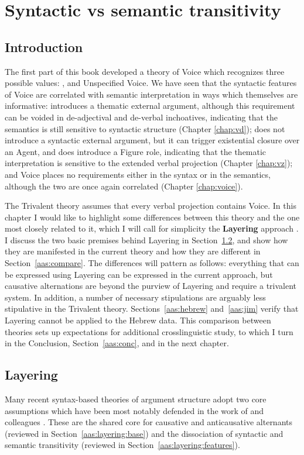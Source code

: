 \chapter{Syntactic vs semantic transitivity}
\label{chap:aas}

\section{Introduction} \label{sec:intro}
The first part of this book developed a theory of Voice which recognizes three possible values: {\vd}, {\vz} and Unspecified Voice. We have seen that the syntactic features of Voice are correlated with semantic interpretation in ways which themselves are informative: {\vd} introduces a thematic external argument, although this requirement can be voided in de-adjectival and de-verbal inchoatives, indicating that the semantics is still sensitive to syntactic structure (Chapter \ref{chap:vd}); {\vz} does not introduce a syntactic external argument, but it can trigger existential closure over an Agent, and {\pz} does introduce a Figure role, indicating that the thematic interpretation is sensitive to the extended verbal projection (Chapter \ref{chap:vz}); and Voice places no requirements either in the syntax or in the semantics, although the two are once again correlated (Chapter \ref{chap:voice}).

The Trivalent theory assumes that every verbal projection contains Voice. In this chapter I would like to highlight some differences between this theory and the one most closely related to it, which I will call for simplicity the \textbf{Layering} approach \citep{schaefer08,layering15}. I discuss the two basic premises behind Layering in Section~\ref{aas:layering}, and show how they are manifested in the current theory and how they are different in Section~\ref{aas:compare}. The differences will pattern as follows: everything that can be expressed using Layering can be expressed in the current approach, but causative alternations are beyond the purview of Layering and require a trivalent system. In addition, a number of necessary stipulations are arguably less stipulative in the Trivalent theory. Sections~\ref{aas:hebrew} and~\ref{aas:jim} verify that Layering cannot be applied to the Hebrew data. This comparison between theories sets up expectations for additional crosslinguistic study, to which I turn in the Conclusion, Section~\ref{aas:conc}, and in the next chapter.


\section{Layering} \label{aas:layering}
Many recent syntax-based theories of argument structure adopt two core assumptions which have been most notably defended in the work of \cite{schaefer08} and colleagues \citep{alexiadouetal06,layering15}. These are the shared core for causative and anticausative alternants (reviewed in Section~\ref{aas:layering:base}) and the dissociation of syntactic and semantic transitivity (reviewed in Section~\ref{aas:layering:features}).

